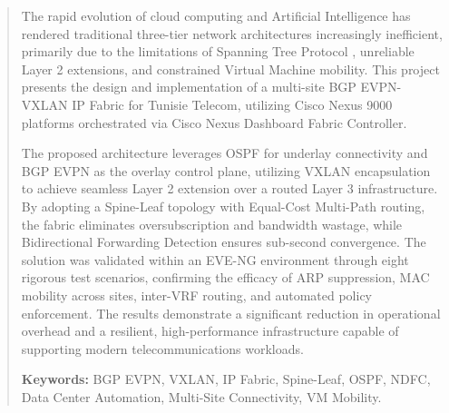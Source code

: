 \begingroup
\renewcommand{\abstractname}{Abstract} %
\setlength{\parindent}{0pt} %
\setlength{\parskip}{1em} %

\begin{abstract}
\noindent The rapid evolution of cloud computing and Artificial Intelligence has rendered traditional three-tier network architectures increasingly inefficient, primarily due to the limitations of Spanning Tree Protocol , unreliable Layer 2 extensions, and constrained Virtual Machine mobility. This project presents the design and implementation of a multi-site BGP EVPN-VXLAN IP Fabric for Tunisie Telecom, utilizing Cisco Nexus 9000 platforms orchestrated via Cisco Nexus Dashboard Fabric Controller.

The proposed architecture leverages OSPF for underlay connectivity and BGP EVPN as the overlay control plane, utilizing VXLAN encapsulation to achieve seamless Layer 2 extension over a routed Layer 3 infrastructure. By adopting a Spine-Leaf topology with Equal-Cost Multi-Path routing, the fabric eliminates oversubscription and bandwidth wastage, while Bidirectional Forwarding Detection ensures sub-second convergence. The solution was validated within an EVE-NG environment through eight rigorous test scenarios, confirming the efficacy of ARP suppression, MAC mobility across sites, inter-VRF routing, and automated policy enforcement. The results demonstrate a significant reduction in operational overhead and a resilient, high-performance infrastructure capable of supporting modern telecommunications workloads.

\vspace{1.5em}
\noindent \textbf{Keywords:} BGP EVPN, VXLAN, IP Fabric, Spine-Leaf, OSPF, NDFC, Data Center Automation, Multi-Site Connectivity, VM Mobility.
\end{abstract}
\endgroup